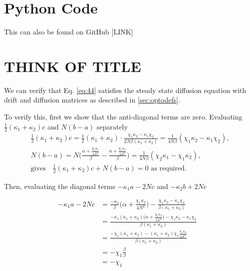 \documentclass[11pt,a4paper]{article}
\numberwithin{equation}{section}
\begin{document}
	\begin{appendices}
	\section{Python Code}
	\label{sec:codeappen}
	This can also be found on GitHub [LINK]
	
	\section{THINK OF TITLE}
	\label{sec:verifyappen}
	
	We can verify that Eq. \ref{eq:44} satisfies the steady state diffusion equation with drift and diffusion matrices as described in \ref{sec:optodefs}.
	
	To verify this, first we show that the anti-diagonal terms are zero. Evaluating $\frac{1}{2}(\kappa_1 + \kappa_2)c$ and $N(b-a)$ separately
	\begin{align*}
	&\frac{1}{2}(\kappa_1 + \kappa_2) c = \frac{1}{2}(\kappa_1 + \kappa_2) \cdot \frac{\chi_1 \kappa_2 - \kappa_1 \chi_2}{2N\beta (\kappa_1+\kappa_2)} = \frac{1}{4N\beta}(\chi_1 \kappa_2 - \kappa_1 \chi_2),&\\
	&N(b-a)= N \Big(\frac{\alpha + \frac{\chi_2 \kappa_1}{4N^2}}{\beta} -\frac{\alpha + \frac{\chi_1 \kappa_2}{4N^2}}{\beta}\Big) = \frac{1}{4N\beta}(\chi_2 \kappa_1 - \chi_1 \kappa_2),&\\
	&\text{gives}\quad\frac{1}{2}(\kappa_1 + \kappa_2)c + N(b-a) = 0\text{ as required.}&
	\end{align*}
	
	Then, evaluating the diagonal terms $-\kappa_1 a - 2Nc$ and $-\kappa_2 b + 2Nc$
	
	\begin{align*}
	-\kappa_1 a - 2Nc &= \frac{-\kappa_1}{\beta} \Big(\alpha + \frac{\chi_1 \kappa_2}{4N^2} \Big) - \frac{\chi_1 \kappa_2 - \kappa_1 \chi_2}{\beta (\kappa_1+\kappa_2)}&\\
	&= \frac{-\kappa_1 (\kappa_1+\kappa_2) \Big(\alpha + \frac{\chi_1 \kappa_2}{4N^2} \Big) - \chi_1 \kappa_2 - \kappa_1 \chi_2}{\beta (\kappa_1+\kappa_2)}&\\
	&= \frac{-\chi_1(\kappa_1+\kappa_2)- (\kappa_1+\kappa_2)\chi_1 \frac{\kappa_1 \kappa_2}{4N^2}}{\beta (\kappa_1+\kappa_2)}&\\
	&= -\chi_1 \frac{\beta}{\beta}&\\
	&= -\chi_1&
	\end{align*}
	

\end{appendices}
\end{document}
